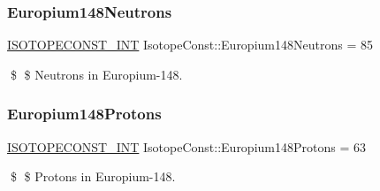 \subsubsection{\texorpdfstring{Europium148\+Neutrons}{Europium148Neutrons}}
{\footnotesize\ttfamily \mbox{\hyperlink{group___isotope_const-_macros_ga5f18360b3e99483a35c32d789e62621c}{I\+S\+O\+T\+O\+P\+E\+C\+O\+N\+S\+T\+\_\+\+I\+NT}} Isotope\+Const\+::\+Europium148\+Neutrons = 85}

\$ \$ Neutrons in Europium-\/148. \mbox{\label{group___isotope_const-_europium-_eu148_ga1d0562ebbe910d1370789ad8bf815bca}} 
\subsubsection{\texorpdfstring{Europium148\+Protons}{Europium148Protons}}
{\footnotesize\ttfamily \mbox{\hyperlink{group___isotope_const-_macros_ga5f18360b3e99483a35c32d789e62621c}{I\+S\+O\+T\+O\+P\+E\+C\+O\+N\+S\+T\+\_\+\+I\+NT}} Isotope\+Const\+::\+Europium148\+Protons = 63}

\$ \$ Protons in Europium-\/148. 